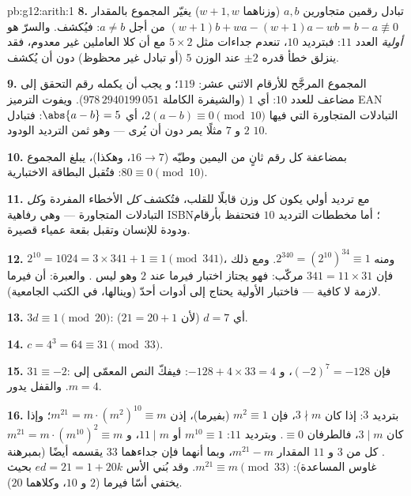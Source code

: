 \begin{solution}{pb:g12:arith:1}
\textbf{8.} تبادل رقمين متجاورين $a, b$ (وزناهما
$w + 1, w$) يغيّر المجموع بالمقدار
$(w+1)b + wa - (w+1)a - wb = b - a \not\equiv 0$ من أجل
$a \neq b$: فيُكشف. والسرّ هو \emph{أولية}
العدد $11$: فبترديد $10$، تنعدم جداءات مثل $5 \times 2$ مع أن
كلا العاملين غير معدوم، فقد ينزلق خطأ قدره $\pm 2$ عند الوزن $5$ (أو
تبادل غير محظوظ) دون أن يُكشف.

\textbf{9.} المجموع المرجَّح للأرقام الاثني عشر: $119$؛ و
يجب أن يكمله رقم التحقق إلى مضاعف للعدد $10$: أي $1$ (والشيفرة
الكاملة $978\,2940199\,051$). ويفوت الترميز EAN التبادلات المتجاورة
التي فيها $2(a - b) \equiv 0 \pmod{10}$، أي
$\abs{a - b} = 5$: فتبادل $2$ و $7$ مثلًا يمر
دون أن يُرى --- وهو ثمن الترديد الودود $10$.

\textbf{10.} بمضاعفة كل رقم ثانٍ من اليمين وطيّه
($16 \to 7$، وهكذا)، يبلغ المجموع $80 \equiv 0
\pmod{10}$: فتُقبل البطاقة الاختبارية.

\textbf{11.} مع ترديد أولي يكون كل وزن قابلًا للقلب،
فتُكشف \emph{كل} الأخطاء المفردة و\emph{كل} التبادلات
المتجاورة --- وهي رفاهية ISBN؛ أما مخططات الترديد $10$
فتحتفظ بأرقام ودودة للإنسان وتقبل بقعة عمياء قصيرة.

\textbf{12.} $2^{10} = 1024 = 3 \times 341 + 1 \equiv 1
\pmod{341}$، ومنه $2^{340} = \left(2^{10}\right)^{34} \equiv
1$. ومع ذلك فإن $341 = 11 \times 31$ مركّب: فهو يجتاز اختبار
فيرما عند  $2$ وهو ليس . والعبرة: أن 
فيرما لازمة لا كافية --- فاختبار الأولية
يحتاج إلى أدوات أحدّ (وينالها، في الكتب
الجامعية).

\textbf{13.} $3d \equiv 1 \pmod{20}$: أي $d = 7$
(لأن $21 = 20 + 1$).

\textbf{14.} $c = 4^3 = 64 \equiv 31 \pmod{33}$.

\textbf{15.} $31 \equiv -2$: فإن $(-2)^7 = -128$، و
$-128 + 4 \times 33 = 4$: فيفكّ النص المعمّى إلى
$m = 4$. والقفل يدور.

\textbf{16.} بترديد $3$: إذا كان $3 \nmid m$، فإن
$m^2 \equiv 1$ (بفيرما)، إذن
$m^{21} = m \cdot \left(m^2\right)^{10} \equiv m$؛ وإذا كان
$3 \mid m$، فالطرفان $\equiv 0$. وبترديد $11$:
$m^{10} \equiv 1$ أو $11 \mid m$، و
$m^{21} = m \cdot \left(m^{10}\right)^2 \equiv m$.  كل من $3$
و $11$ المقدار $m^{21} - m$، وبما أنهما  فإن جداءهما
$33$ يقسمه أيضًا (بمبرهنة غاوس المساعدة): $m^{21} \equiv m \pmod{33}$. وقد بُني
الأس $ed = 21 = 1 + 20k$ بحيث يختفي أسّا فيرما
($2$ و $10$، وكلاهما  $20$).


\end{solution}
